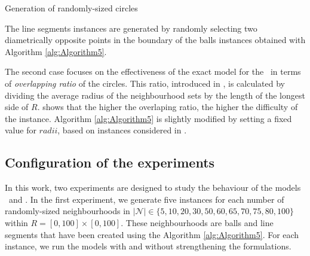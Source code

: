 \documentclass[a4paper,  review, authoryear, 1p.]{elsarticle}
\newcommand{\TSPHN}{{\sf{H-TSPHN}\xspace }}
\newcommand{\TSPN}{{\sf{H-TSPN}\xspace }}
\begin{document}
\begin{algorithm}[H]
	\caption{Generation of randomly-sized circles}
	\label{alg:Algorithm5}
	
\end{algorithm}

The line segments instances are generated by randomly selecting two diametrically opposite points in the boundary of the balls instances obtained with Algorithm \ref{alg:Algorithm5}.


The second case focuses on the effectiveness of the exact model for the \TSPN \ in terms of \emph{overlapping ratio} of the circles. This ratio, introduced in \cite{mennell2009a}, is calculated by dividing the average radius of the neighbourhood sets by the length of the longest side of $R$. \cite{mennell2009a} shows that the higher the overlaping ratio, the higher the difficulty of the instance. Algorithm \ref{alg:Algorithm5} is slightly modified by setting a fixed value for $radii$, based on instances considered in \cite{behdani2014}.



\subsection{Configuration of the experiments}
In this work, two experiments are designed to study the behaviour of the models \TSPHN \ and \TSPN. In the first experiment, we generate five instances for each number of randomly-sized neighbourhoods in $|\mathcal N|\in\{5, 10, 20, 30, 50, 60, 65, 70, 75, 80, 100\}$ within $R=[0,100]\times[0, 100]$. These neighbourhoods are balls and line segments that have been created using the Algorithm \ref{alg:Algorithm5}. For each instance, we run the models with and without strengthening the formulations.
\end{document}
